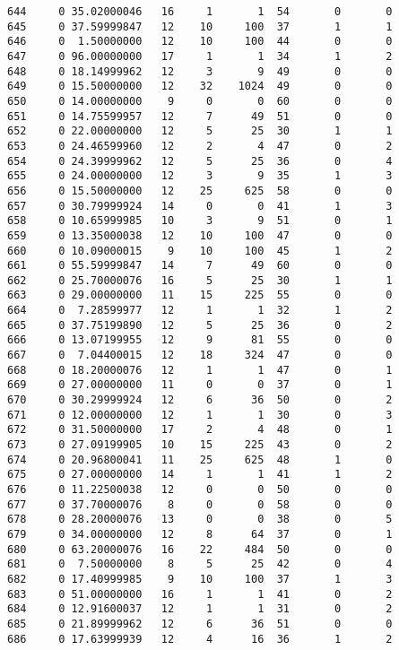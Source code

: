 \documentclass[
  letterpaper,
  DIV=11,
  numbers=noendperiod]{scrreprt}
\begin{document}
\begin{verbatim}
644     0 35.02000046   16     1       1  54       0       0
645     0 37.59999847   12    10     100  37       1       1
646     0  1.50000000   12    10     100  44       0       0
647     0 96.00000000   17     1       1  34       1       2
648     0 18.14999962   12     3       9  49       0       0
649     0 15.50000000   12    32    1024  49       0       0
650     0 14.00000000    9     0       0  60       0       0
651     0 14.75599957   12     7      49  51       0       0
652     0 22.00000000   12     5      25  30       1       1
653     0 24.46599960   12     2       4  47       0       2
654     0 24.39999962   12     5      25  36       0       4
655     0 24.00000000   12     3       9  35       1       3
656     0 15.50000000   12    25     625  58       0       0
657     0 30.79999924   14     0       0  41       1       3
658     0 10.65999985   10     3       9  51       0       1
659     0 13.35000038   12    10     100  47       0       0
660     0 10.09000015    9    10     100  45       1       2
661     0 55.59999847   14     7      49  60       0       0
662     0 25.70000076   16     5      25  30       1       1
663     0 29.00000000   11    15     225  55       0       0
664     0  7.28599977   12     1       1  32       1       2
665     0 37.75199890   12     5      25  36       0       2
666     0 13.07199955   12     9      81  55       0       0
667     0  7.04400015   12    18     324  47       0       0
668     0 18.20000076   12     1       1  47       0       1
669     0 27.00000000   11     0       0  37       0       1
670     0 30.29999924   12     6      36  50       0       2
671     0 12.00000000   12     1       1  30       0       3
672     0 31.50000000   17     2       4  48       0       1
673     0 27.09199905   10    15     225  43       0       2
674     0 20.96800041   11    25     625  48       1       0
675     0 27.00000000   14     1       1  41       1       2
676     0 11.22500038   12     0       0  50       0       0
677     0 37.70000076    8     0       0  58       0       0
678     0 28.20000076   13     0       0  38       0       5
679     0 34.00000000   12     8      64  37       0       1
680     0 63.20000076   16    22     484  50       0       0
681     0  7.50000000    8     5      25  42       0       4
682     0 17.40999985    9    10     100  37       1       3
683     0 51.00000000   16     1       1  41       0       2
684     0 12.91600037   12     1       1  31       0       2
685     0 21.89999962   12     6      36  51       0       0
686     0 17.63999939   12     4      16  36       1       2

\end{verbatim}
\end{document}
